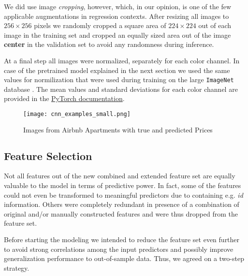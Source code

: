 We did use image \emph{cropping}, however, which, in our opinion, is one of the few applicable augmentations in regression contexts.
After resizing all images to $256 \times 256$ pixels we randomly cropped a square area of $224 \times 224$ out of each image in the training set and cropped an equally sized area out of the image \textbf{center} in the validation set to avoid any randomness during inference.

At a final step all images were normalized, separately for each color channel.
In case of the pretrained model explained in the next section we used the same values for normilization that were used during training on the large \texttt{ImageNet} database \citep{russakovsky2015}.
The mean values and standard deviations for each color channel are provided in the \href{https://pytorch.org/vision/stable/models.html}{PyTorch documentation}.

\begin{figure}[t]
    \centering
    \texttt{[image: cnn\_examples\_small.png]}
    \caption{Images from Airbnb Apartments with true and predicted Prices}
    \label{fig:cnn-examples}
\end{figure}

\subsection{Feature Selection} \label{appendix:feature-selection}

Not all features out of the new combined and extended feature set are equally valuable to the model in terms of predictive power.
In fact, some of the features could not even be transformed to meaningful predictors due to containing e.g. \emph{id} information.
Others were completely redundant in presence of a combination of original and/or manually constructed features and were thus dropped from the feature set.

Before starting the modeling we intended to reduce the feature set even further to avoid strong correlations among the input predictors and possibly improve generalization performance to out-of-sample data.
Thus, we agreed on a two-step strategy.

